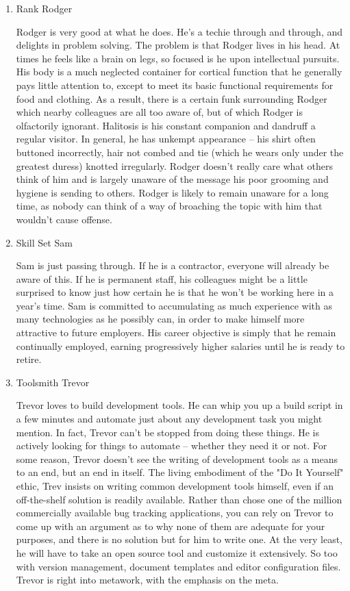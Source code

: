 \documentclass{article}
\begin{document}
\begin{enumerate}
\item Rank Rodger
\label{sec:orgheadline21}

Rodger is very good at what he does. He's a techie through and through,
and delights in problem solving. The problem is that Rodger lives in his
head. At times he feels like a brain on legs, so focused is he upon
intellectual pursuits. His body is a much neglected container for
cortical function that he generally pays little attention to, except to
meet its basic functional requirements for food and clothing. As a
result, there is a certain funk surrounding Rodger which nearby
colleagues are all too aware of, but of which Rodger is olfactorily
ignorant. Halitosis is his constant companion and dandruff a regular
visitor. In general, he has unkempt appearance -- his shirt often
buttoned incorrectly, hair not combed and tie (which he wears only under
the greatest duress) knotted irregularly. Rodger doesn't really care
what others think of him and is largely unaware of the message his poor
grooming and hygiene is sending to others. Rodger is likely to remain
unaware for a long time, as nobody can think of a way of broaching the
topic with him that wouldn't cause offense.

\item Skill Set Sam
\label{sec:orgheadline22}

Sam is just passing through. If he is a contractor, everyone will
already be aware of this. If he is permanent staff, his colleagues might
be a little surprised to know just how certain he is that he won't be
working here in a year's time. Sam is committed to accumulating as much
experience with as many technologies as he possibly can, in order to
make himself more attractive to future employers. His career objective
is simply that he remain continually employed, earning progressively
higher salaries until he is ready to retire.

\item Toolsmith Trevor
\label{sec:orgheadline23}

Trevor loves to build development tools. He can whip you up a build
script in a few minutes and automate just about any development task you
might mention. In fact, Trevor can't be stopped from doing these things.
He is actively looking for things to automate -- whether they need it or
not. For some reason, Trevor doesn't see the writing of development
tools as a means to an end, but an end in itself. The living embodiment
of the "Do It Yourself" ethic, Trev insists on writing common
development tools himself, even if an off-the-shelf solution is readily
available. Rather than chose one of the million commercially available
bug tracking applications, you can rely on Trevor to come up with an
argument as to why none of them are adequate for your purposes, and
there is no solution but for him to write one. At the very least, he
will have to take an open source tool and customize it extensively. So
too with version management, document templates and editor configuration
files. Trevor is right into metawork, with the emphasis on the meta.


\end{enumerate}
\end{document}
